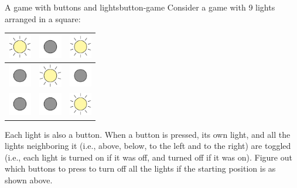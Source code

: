 \begin{example}{A game with buttons and lights}{button-game}
  Consider a game with 9 lights arranged in a square:
  \begin{center}
    \begin{tabular}{|c|c|c|}
      \hline
      \includegraphics[width=1cm]{figures/lighton} &
      \includegraphics[width=1cm]{figures/lightoff} &
      \includegraphics[width=1cm]{figures/lighton} \\\hline 
      \includegraphics[width=1cm]{figures/lightoff} &
      \includegraphics[width=1cm]{figures/lighton} &
      \includegraphics[width=1cm]{figures/lightoff} \\\hline 
      \includegraphics[width=1cm]{figures/lightoff} &
      \includegraphics[width=1cm]{figures/lightoff} &
      \includegraphics[width=1cm]{figures/lighton} \\\hline 
    \end{tabular}
  \end{center}
  Each light is also a button. When a button is pressed, its own
  light, and all the lights neighboring it (i.e., above, below, to the
  left and to the right) are toggled (i.e., each light is turned on if
  it was off, and turned off if it was on). Figure out which buttons
  to press to turn off all the lights if the starting position is as
  shown above.
\end{example}

